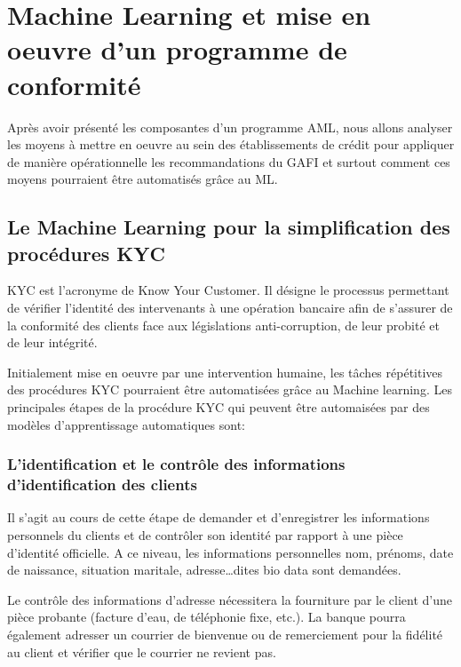 \section{Machine Learning et mise en oeuvre d'un programme de conformité}

Après avoir présenté les composantes d'un programme AML, nous allons analyser
les moyens à mettre en oeuvre au sein des établissements de crédit pour 
appliquer de manière opérationnelle les recommandations du GAFI
 et surtout 
comment ces moyens pourraient être automatisés grâce au ML.
 
\subsection{Le Machine Learning pour la simplification des procédures KYC}
 
KYC  est l'acronyme de Know Your Customer. Il désigne le processus permettant 
de vérifier l'identité des intervenants à une opération bancaire afin de 
s'assurer de la conformité des clients face aux législations anti-corruption,
de leur probité et de leur intégrité.

Initialement mise en oeuvre par une intervention humaine, les tâches 
répétitives des procédures KYC pourraient être automatisées grâce au 
Machine learning. Les principales étapes de la procédure KYC qui peuvent être
automaisées par des modèles d'apprentissage automatiques sont:
  
  \subsubsection{L'identification et le contrôle des informations 
    d'identification des clients}
    Il s'agit au cours de cette étape de demander et d'enregistrer les
    informations personnels du clients et de contrôler son identité par rapport
    à une pièce d'identité officielle. A ce niveau, les informations
    personnelles nom, prénoms, date de naissance, situation maritale,
    adresse\ldots dites \og bio data \fg sont demandées.

    Le contrôle des informations d'adresse nécessitera la fourniture par le 
    client d'une pièce probante (facture d'eau, de téléphonie fixe, etc.).
    La banque pourra également adresser un courrier de bienvenue ou de 
    remerciement pour la fidélité au client  et vérifier que le courrier ne
    revient pas.


